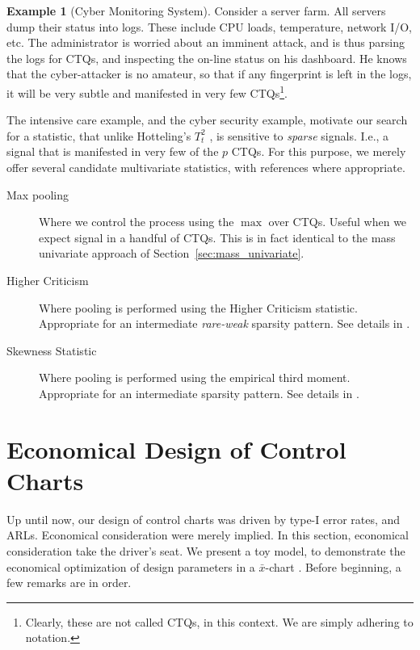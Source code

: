 \documentclass[12pt,a4paper]{report}
\theoremstyle{plain}
\theoremstyle{definition}
\newtheorem{example}{Example}
\newcommand{\barxChart}{$\bar{x}$-chart }
\newcommand{\tsq}{$T^2_t$ }
\begin{document}
\begin{example}[Cyber Monitoring System]
\label{eg:cyber}
Consider a server farm. All servers dump their status into logs. These include CPU loads, temperature, network I/O, etc.
The administrator is worried about an imminent attack, and is thus parsing the logs for CTQs, and inspecting the on-line status on his dashboard.
He knows that the cyber-attacker is no amateur, so that if any fingerprint is left in the logs, it will be very subtle and manifested in very few CTQs\footnote{Clearly, these are not called CTQs, in this context. We are simply adhering to notation.}.
\end{example}

The intensive care example, and the cyber security example, motivate our search for a statistic, that unlike Hotteling's \tsq, is sensitive to \emph{sparse} signals. 
I.e., a signal that is manifested in very few of the $p$ CTQs.
For this purpose, we merely offer several candidate multivariate statistics, with references where appropriate.
\begin{description}
\item [Max pooling] Where we control the process using the $\max$ over CTQs. Useful when we expect signal in a handful of CTQs. This is in fact identical to the mass univariate approach of Section~\ref{sec:mass_univariate}.
\item [Higher Criticism] Where pooling is performed using the Higher Criticism statistic. Appropriate for an intermediate \emph{rare-weak} sparsity pattern. See details in \citep{jin_cosmological_2005}.
\item [Skewness Statistic] Where pooling is performed using the empirical third moment. Appropriate for an intermediate sparsity pattern. See details in \citep{jin_cosmological_2005}.
\end{description}







\section{Economical Design of Control Charts}
\label{sec:economical_considerations}

Up until now, our design of control charts was driven by type-I error rates, and ARLs. Economical consideration were merely implied.
In this section, economical consideration take the driver's seat. 
We present a toy model, to demonstrate the economical optimization of design parameters in a \barxChart. 
Before beginning, a few remarks are in order. 
\end{document}
